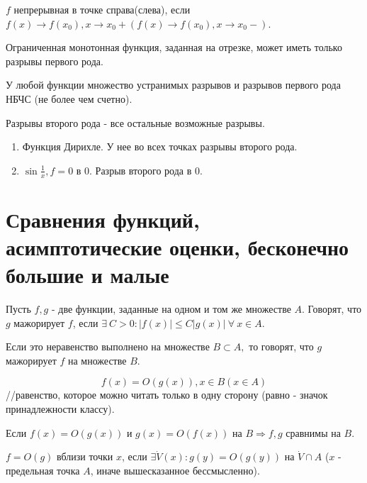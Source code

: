 \documentclass[12pt]{report}
\begin{document}
\begin{defn}
$f$ непрерывная в точке справа(слева), если $f(x) \to f(x_0), x \to x_0+ (f(x) \to f(x_0), x \to x_0-)$.
\end{defn}

\begin{st}
Ограниченная монотонная функция, заданная на отрезке, может иметь только разрывы первого рода.

У любой функции множество устранимых разрывов и разрывов первого рода НБЧС (не более чем счетно).
\end{st}

\begin{defn}
Разрывы второго рода - все остальные возможные разрывы.
\end{defn}
\begin{ex}
\begin{enumerate}
\item Функция Дирихле. У нее во всех точках разрывы второго рода.
\item $\sin{\frac{1}{x}}, f = 0$ в $0$. Разрыв второго рода в $0$.
\end{enumerate}
\end{ex}

\chapter{Сравнения функций, асимптотические оценки, бесконечно большие и малые}

\begin{defn}
Пусть $f, g$ - две функции, заданные на одном и том же множестве $A$. Говорят, что $g$ мажорирует $f$, если $\exists ~C > 0: |f(x)| \le C|g(x)| ~\forall ~x \in A$.

Если это неравенство выполнено на множестве $B \subset A,$ то говорят, что $g$ мажорирует $f$ на множестве $B$.

$$f(x) = O(g(x)), x \in B (x \in A)$$
//равенство, которое можно читать только в одну сторону (равно - значок принадлежности классу).
\end{defn}

\begin{defn}
Если $f(x) = O(g(x))$ и $g(x) = O(f(x))$ на $B \Rightarrow f, g$ сравнимы на $B$.
\end{defn}

\begin{defn}
$f = O(g)$ вблизи точки $x$, если $\exists \dot V(x): g(y) = O(g(y))$ на $\dot V \cap A$ ($x$ - предельная точка $A$, иначе вышесказанное бессмысленно).
\end{defn}
\end{document}
